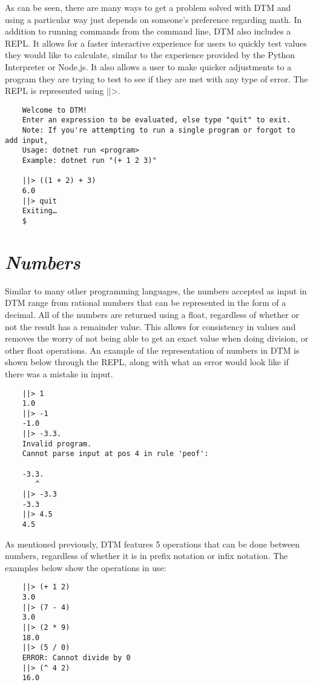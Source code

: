 \documentclass[10pt]{article}
\begin{document}
As can be seen, there are many ways to get a problem solved with DTM and using a particular way just depends on someone's preference regarding math. In addition to running commands from the command line, DTM also includes a REPL. It allows for a faster interactive experience for users to quickly test values they would like to calculate, similar to the experience provided by the Python Interpreter or Node.js. It also allows a user to make quicker adjustments to a program they are trying to test to see if they are met with any type of error. The REPL is represented using $\texttt{||>}$.

\begin{verbatim}
    Welcome to DTM!
    Enter an expression to be evaluated, else type "quit" to exit.
    Note: If you're attempting to run a single program or forgot to add input, 
    Usage: dotnet run <program> 
    Example: dotnet run "(+ 1 2 3)"
    
    ||> ((1 + 2) + 3)
    6.0
    ||> quit
    Exiting…
    $
\end{verbatim}

\section{\textit{Numbers}}

Similar to many other programming languages, the numbers accepted as input in DTM range from rational numbers that can be represented in the form of a decimal. All of the numbers are returned using a float, regardless of whether or not the result has a remainder value. This allows for consistency in values and removes the worry of not being able to get an exact value when doing division, or other float operations. An example of the representation of numbers in DTM is shown below through the REPL, along with what an error would look like if there was a mistake in input. 

\begin{verbatim}
    ||> 1 
    1.0
    ||> -1
    -1.0
    ||> -3.3.
    Invalid program.
    Cannot parse input at pos 4 in rule 'peof':
    
    -3.3.
       ^
    ||> -3.3
    -3.3
    ||> 4.5
    4.5
\end{verbatim}

As mentioned previously, DTM features 5 operations that can be done between numbers, regardless of whether it is in prefix notation or infix notation. The examples below show the operations in use:

\begin{verbatim}
    ||> (+ 1 2)
    3.0
    ||> (7 - 4)
    3.0
    ||> (2 * 9)
    18.0
    ||> (5 / 0)
    ERROR: Cannot divide by 0
    ||> (^ 4 2)
    16.0
\end{verbatim}
\end{document}
